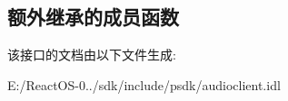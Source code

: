 \subsection*{额外继承的成员函数}


该接口的文档由以下文件生成\+:\begin{DoxyCompactItemize}
\item 
E\+:/\+React\+O\+S-\/0../sdk/include/psdk/audioclient.\+idl\end{DoxyCompactItemize}
